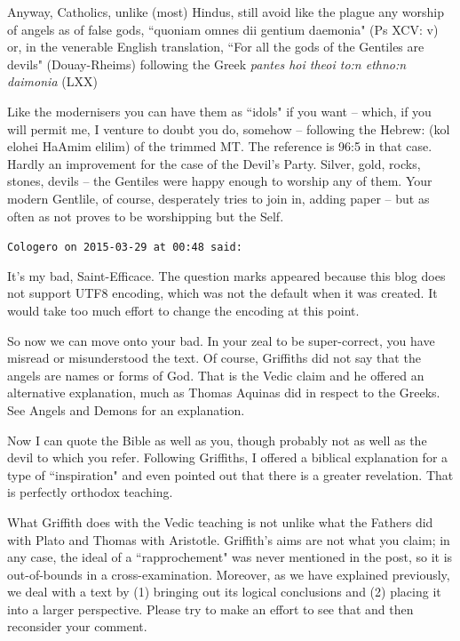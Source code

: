 \begin{footnotesize}
\begin{sffamily}
Anyway, Catholics, unlike (most) Hindus, still avoid like the plague any worship of angels as of false gods, ``quoniam omnes dii gentium daemonia" (Ps XCV: v) or, in the venerable English translation, ``For all the gods of the Gentiles are devils" (Douay-Rheims) following the Greek \textit{pantes hoi theoi to:n ethno:n daimonia} (LXX)

Like the modernisers you can have them as ``idols" if you want – which, if you will permit me, I venture to doubt you do, somehow – following the Hebrew: (kol elohei HaAmim elilim) of the trimmed MT. The reference is 96:5 in that case. Hardly an improvement for the case of the Devil's Party. Silver, gold, rocks, stones, devils – the Gentiles were happy enough to worship any of them. Your modern Gentlile, of course, desperately tries to join in, adding paper – but as often as not proves to be worshipping but the Self.


\hfill

\texttt{Cologero on 2015-03-29 at 00:48 said: }

It's my bad, Saint-Efficace. The question marks appeared because this blog does not support UTF8 encoding, which was not the default when it was created. It would take too much effort to change the encoding at this point.

So now we can move onto your bad. In your zeal to be super-correct, you have misread or misunderstood the text. Of course, Griffiths did not say that the angels are names or forms of God. That is the Vedic claim and he offered an alternative explanation, much as Thomas Aquinas did in respect to the Greeks. See Angels and Demons for an explanation.

Now I can quote the Bible as well as you, though probably not as well as the devil to which you refer. Following Griffiths, I offered a biblical explanation for a type of ``inspiration" and even pointed out that there is a greater revelation. That is perfectly orthodox teaching.

What Griffith does with the Vedic teaching is not unlike what the Fathers did with Plato and Thomas with Aristotle. Griffith's aims are not what you claim; in any case, the ideal of a ``rapprochement" was never mentioned in the post, so it is out-of-bounds in a cross-examination. Moreover, as we have explained previously, we deal with a text by (1) bringing out its logical conclusions and (2) placing it into a larger perspective. Please try to make an effort to see that and then reconsider your comment.


\end{sffamily}
\end{footnotesize}

